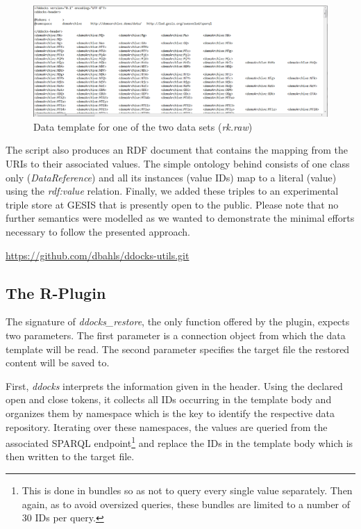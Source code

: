 \documentclass{sig-alternate}
\begin{document}
\begin{figure}[htb]
\centering
\includegraphics[width=.95\textwidth]{img/datatemplate.png}
\caption{
Data template for one of the two data sets (\textit{rk.raw})
}
\label{fig:datatemplate}
\end{figure}


The script also produces an RDF document that contains the mapping from the URIs to their associated values.
The simple ontology behind consists of one class only (\textit{DataReference}) and all its instances (value IDs) map to a literal (value) using the \textit{rdf:value} relation.
Finally, we added these triples to an experimental triple store at GESIS that is presently open to the public.
Please note that no further semantics were modelled as we wanted to demonstrate the minimal efforts necessary to follow the presented approach.

%
%
\url{https://github.com/dbahls/ddocks-utils.git}



\subsection{The R-Plugin}


The signature of \textit{ddocks\_restore}, the only function offered by the plugin, expects two parameters.
The first parameter is a connection object from which the data template will be read.
The second parameter specifies the target file the restored content will be saved to.

First, \textit{ddocks} interprets the information given in the header.
Using the declared open and close tokens, it collects all IDs occurring in the template body and organizes them by namespace which is the key to identify the respective data repository.
Iterating over these namespaces, the values are queried from the associated SPARQL endpoint\footnote{This is done in bundles so as not to query every single value separately. Then again, as to avoid oversized queries, these bundles are limited to a number of 30 IDs per query.}
and replace the IDs in the template body which is then written to the target file.
\end{document}
